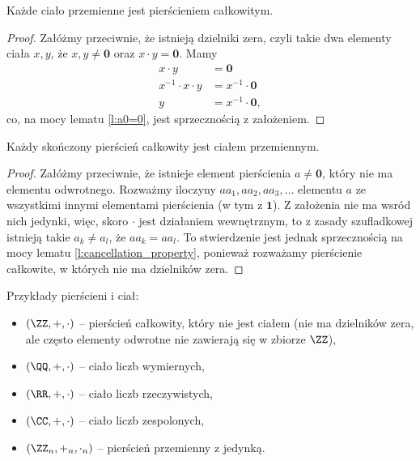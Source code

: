 \begin{theorem}
    Każde ciało przemienne jest pierścieniem całkowitym.
\end{theorem}
\begin{proof}
    Załóżmy przeciwnie, że istnieją dzielniki zera, czyli takie dwa elementy ciała $x, y$, że $x, y \neq \mathbf{0}$ oraz $x \cdot y = \mathbf{0}$. Mamy
    \begin{align*}
        x \cdot y &= \mathbf{0} \\
        x^{-1} \cdot x \cdot y &= x^{-1} \cdot \mathbf{0} \\
        y &= x^{-1} \cdot \mathbf{0},
    \end{align*}
    co, na mocy lematu \ref{l:a0=0}, jest sprzecznością z założeniem.
\end{proof}

\begin{theorem}
    Każdy skończony pierścień całkowity jest ciałem przemiennym.
\end{theorem}
\begin{proof}
    Załóżmy przeciwnie, że istnieje element pierścienia $a \neq \mathbf{0}$, który nie ma elementu odwrotnego. Rozważmy iloczyny $aa_1, aa_2, aa_3, \ldots$ elementu $a$ ze wszystkimi innymi elementami pierścienia (w tym z $\mathbf{1}$). Z założenia nie ma wsród nich jedynki, więc, skoro $\cdot$ jest działaniem wewnętrznym, to z zasady szufladkowej istnieją takie $a_k \neq a_l$, że $aa_k = aa_l$. To stwierdzenie jest jednak sprzecznością na mocy lematu \ref{l:cancellation_property}, ponieważ rozważamy pierścienie całkowite, w których nie ma dzielników zera.
\end{proof}

\begin{example}
    Przykłady pierścieni i ciał:
    \begin{itemize}
        \item $(\ZZ, +, \cdot)$ -- pierścień całkowity, który nie jest ciałem (nie ma dzielników zera, ale często elementy odwrotne nie zawierają się w zbiorze $\ZZ$),
        \item $(\QQ, +, \cdot)$ -- ciało liczb wymiernych,
        \item $(\RR, +, \cdot)$ -- ciało liczb rzeczywistych,
        \item $(\CC, +, \cdot)$ -- ciało liczb zespolonych,
        \item $(\ZZ_n, +_n, \cdot_n)$ -- pierścień przemienny z jedynką.
    \end{itemize}
\end{example}

